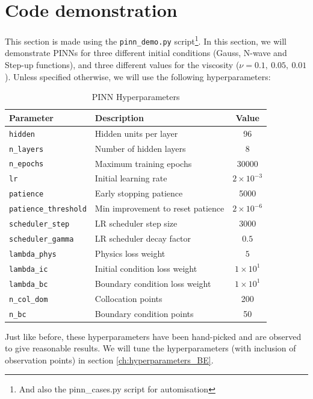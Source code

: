 \documentclass[we,twoside,openright,a4paper,11pt]{uantwerpenbamathesis}
\begin{document}
\section{Code demonstration}
This section is made using the \verb|pinn_demo.py| script\footnote{And also the pinn\_cases.py script for automisation}. In this section, we will demonstrate PINNs for three different initial conditions (Gauss, N-wave and Step-up functions), and three different values for the viscosity ($\nu=0.1,\ 0.05,\ 0.01$). Unless specified otherwise, we will use the following hyperparameters:

\begin{table}[H]
\centering
\caption{PINN Hyperparameters}\label{tab:standard_parameters_BE}
\begin{tabular}{llc}
\toprule
\textbf{Parameter} & \textbf{Description} & \textbf{Value} \\
\midrule
\texttt{hidden}               & Hidden units per layer            & 96                   \\
\texttt{n\_layers}            & Number of hidden layers           & 8                    \\
\texttt{n\_epochs}            & Maximum training epochs           & 30000                \\
\texttt{lr}                   & Initial learning rate             & $2\times10^{-3}$     \\
\texttt{patience}             & Early stopping patience           & 5000                 \\
\texttt{patience\_threshold}  & Min improvement to reset patience & $2\times10^{-6}$     \\
\texttt{scheduler\_step}      & LR scheduler step size            & 3000                 \\
\texttt{scheduler\_gamma}     & LR scheduler decay factor         & $0.5$                \\
\texttt{lambda\_phys}         & Physics loss weight               & $5$                  \\
\texttt{lambda\_ic}           & Initial condition loss weight     & $1\times10^{1}$      \\
\texttt{lambda\_bc}           & Boundary condition loss weight    & $1\times10^{1}$      \\
\texttt{n\_col\_dom}          & Collocation points                & 200                  \\
\texttt{n\_bc}                & Boundary condition points         & 50                   \\
\bottomrule
\end{tabular}
\end{table}
Just like before, these hyperparameters have been hand-picked and are observed to give reasonable results. We will tune the hyperparameters (with inclusion of observation points) in section \ref{ch:hyperparameters_BE}.
\end{document}
